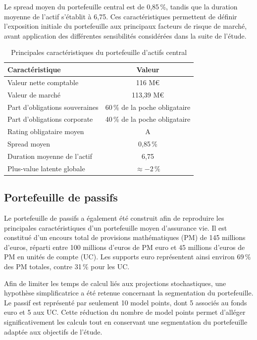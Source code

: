 Le spread moyen du portefeuille central est de 0,85\,\%, tandis que la duration moyenne de l'actif s'établit à 6,75. Ces caractéristiques permettent de définir l'exposition initiale du portefeuille aux principaux facteurs de risque de marché, avant application des différentes sensibilités considérées dans la suite de l'étude.

\begin{table}[H]
    \centering
    \caption{Principales caractéristiques du portefeuille d'actifs central}
    \label{tab:caracteristiques_actif_central}
    \begin{tabular}{lc}
        \hline
        \textbf{Caractéristique} & \textbf{Valeur} \\
        \hline
        Valeur nette comptable & 116 M\euro \\
        Valeur de marché & 113,39 M\euro \\
        Part d'obligations souveraines & 60\,\% de la poche obligataire \\
        Part d'obligations corporate & 40\,\% de la poche obligataire \\
        Rating obligataire moyen & A \\
        Spread moyen & 0,85\,\% \\
        Duration moyenne de l'actif & 6,75 \\
        Plus-value latente globale & $\approx -2\,\%$ \\
        \hline
    \end{tabular}
\end{table}


\subsection{Portefeuille de passifs}

Le portefeuille de passifs a également été construit afin de reproduire les principales caractéristiques d'un portefeuille moyen d'assurance vie. Il est constitué d'un encours total de provisions mathématiques (PM) de 145 millions d'euros, réparti entre 100 millions d'euros de PM euro et 45 millions d'euros de PM en unités de compte (UC). Les supports euro représentent ainsi environ 69\,\% des PM totales, contre 31\,\% pour les UC.

Afin de limiter les temps de calcul liés aux projections stochastiques, une hypothèse simplificatrice a été retenue concernant la segmentation du portefeuille. Le passif est représenté par seulement 10 model points, dont 5 associés au fonds euro et 5 aux UC. Cette réduction du nombre de model points permet d'alléger significativement les calculs tout en conservant une segmentation du portefeuille adaptée aux objectifs de l'étude.

